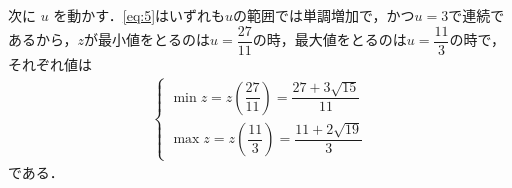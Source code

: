 \documentclass[../../main.tex]{subfiles}
\begin{document}
次に $u$ を動かす．\cref{eq:5}はいずれも$u$の範囲では単調増加で，かつ$u=3$で連続であるから，$z$が最小値をとるのは$u=\dfrac{27}{11}$の時，最大値をとるのは$u=\dfrac{11}{3}$の時で，それぞれ値は
\begin{align}
  \begin{cases}
    \min z = z\left(\dfrac{27}{11}\right) = \dfrac{27+3\sqrt{15}}{11} \\
    \max z = z\left(\dfrac{11}{3}\right)  = \dfrac{11+2\sqrt{19}}{3}
  \end{cases}
\end{align}
である．
\end{document}
